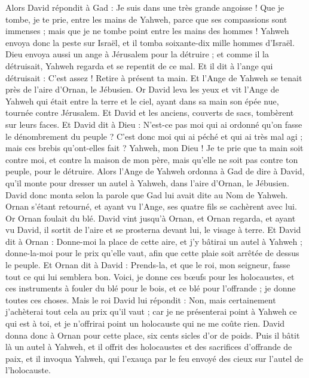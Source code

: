 \begin{multicols}{2}
Alors David répondit à Gad : Je suis dans une très grande angoisse ! Que je tombe, je te prie, entre les mains de Yahweh, parce que ses compassions sont immenses ; mais que je ne tombe point entre les mains des hommes !
Yahweh envoya donc la peste sur Israël, et il tomba soixante-dix mille hommes d'Israël.
Dieu envoya aussi un ange à Jérusalem pour la détruire ; et comme il la détruisait, Yahweh regarda et se repentit de ce mal. Et il dit à l'ange qui détruisait : C'est assez ! Retire à présent ta main. Et l'Ange de Yahweh se tenait près de l'aire d'Ornan, le Jébusien.
Or David leva les yeux et vit l'Ange de Yahweh qui était entre la terre et le ciel, ayant dans sa main son épée nue, tournée contre Jérusalem. Et David et les anciens, couverts de sacs, tombèrent sur leurs faces.
Et David dit à Dieu : N'est-ce pas moi qui ai ordonné qu'on fasse le dénombrement du peuple ? C'est donc moi qui ai péché et qui ai très mal agi ; mais ces brebis qu'ont-elles fait ? Yahweh, mon Dieu ! Je te prie que ta main soit contre moi, et contre la maison de mon père, mais qu'elle ne soit pas contre ton peuple, pour le détruire.
Alors l'Ange de Yahweh ordonna à Gad de dire à David, qu'il monte pour dresser un autel à Yahweh, dans l'aire d'Ornan, le Jébusien.
David donc monta selon la parole que Gad lui avait dite au Nom de Yahweh.
Ornan s'étant retourné, et ayant vu l'Ange, ses quatre fils se cachèrent avec lui. Or Ornan foulait du blé.
David vint jusqu'à Ornan, et Ornan regarda, et ayant vu David, il sortit de l'aire et se prosterna devant lui, le visage à terre.
Et David dit à Ornan : Donne-moi la place de cette aire, et j'y bâtirai un autel à Yahweh ; donne-la-moi pour le prix qu'elle vaut, afin que cette plaie soit arrêtée de dessus le peuple.
Et Ornan dit à David : Prends-la, et que le roi, mon seigneur, fasse tout ce qui lui semblera bon. Voici, je donne ces bœufs pour les holocaustes, et ces instruments à fouler du blé pour le bois, et ce blé pour l'offrande ; je donne toutes ces choses.
Mais le roi David lui répondit : Non, mais certainement j'achèterai tout cela au prix qu'il vaut ; car je ne présenterai point à Yahweh ce qui est à toi, et je n'offrirai point un holocauste qui ne me coûte rien.
David donna donc à Ornan pour cette place, six cents sicles d'or de poids.
Puis il bâtit là un autel à Yahweh, et il offrit des holocaustes et des sacrifices d'offrande de paix, et il invoqua Yahweh, qui l'exauça par le feu envoyé des cieux sur l'autel de l'holocauste.

\end{multicols}
